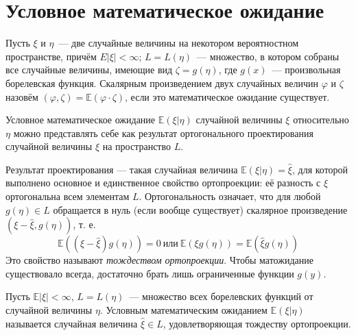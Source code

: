 \section{Условное математическое ожидание}

Пусть $\xi$ и $\eta$~--- две случайные величины на некотором вероятностном пространстве, причём $E|\xi|<\infty$; $L=L(\eta)$~--- множество, в котором собраны все случайные величины, имеющие вид $\zeta=g(\eta)$, где $g(x)$~--- произвольная борелевская функция. Скалярным произведением двух случайных величин $\varphi$ и $\zeta$ назовём $(\varphi, \zeta)=\mathbb{E}(\varphi \cdot \zeta)$, если это математическое ожидание существует.

Условное математическое ожидание $\mathbb{E}(\xi | \eta)$ случайной величины $\xi$ относительно $\eta$ можно представлять себе как результат ортогонального проектирования случайной величины $\xi$ на пространство $L$.

Результат проектирования — такая случайная величина $\mathbb{E}(\xi | \eta)=\widehat{\xi}$, для которой выполнено основное и единственное свойство ортопроекции: её разность с $\xi$ ортогональна всем элементам $L$. Ортогональность означает, что для любой $g(\eta) \in L$ обращается в нуль (если вообще существует) скалярное произведение $(\xi-\widehat{\xi}, g(\eta))$, т. е.
\begin{equation*}
    \mathbb{E}((\xi-\widehat{\xi}) g(\eta))=0~ \text{или}~ \mathbb{E}(\xi g(\eta))=\mathbb{E}(\widehat{\xi} g(\eta))
\end{equation*}
Это свойство называют {\it тождеством ортопроекции}. Чтобы матожидание существовало всегда, достаточно брать лишь ограниченные функции $g(y)$.

\begin{defn}
    Пусть $\mathbb{E}|\xi|<\infty$, $L=L(\eta)$~--- множество всех борелевских функций от случайной величины $\eta$. Условным математическим ожиданием $\mathbb{E}(\xi | \eta)$ называется случайная величина $\widehat{\xi} \in L$, удовлетворяющая тождеству ортопроекции.
\end{defn}

